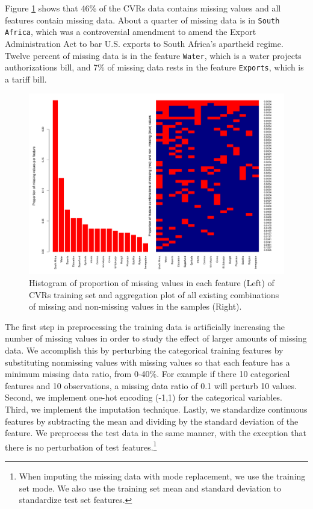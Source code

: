 \documentclass[10pt]{book}
\theoremstyle{definition}
\begin{document}
Figure \ref{fig:proportion-missing-votes} shows that 46\% of the CVRs data contains missing values and all features contain missing data. About a quarter of missing data is in \texttt{South Africa}, which was a controversial amendment to amend the Export Administration Act to bar U.S. exports to South Africa's apartheid regime. Twelve percent of missing data is in the feature \texttt{Water}, which is a water projects authorizations bill, and 7\% of missing data rests in the feature \texttt{Exports}, which is a tariff bill. 

\begin{figure}[h!]
\includegraphics [scale=0.45]{figure/proportion-missing-votes.pdf}\par
\caption{\footnotesize Histogram of proportion of missing values in each feature (Left) of CVRs training set and aggregation plot of all existing combinations of missing and non-missing values in the samples (Right).}
 \label{fig:proportion-missing-votes}
\end{figure}

\par
{}

The first step in preprocessing the training data is artificially increasing the number of missing values in order to study the effect of larger amounts of missing data. We accomplish this by perturbing the categorical training features by substituting nonmissing values with missing values so that each feature has a minimum missing data ratio, from 0-40\%. For example if there 10 categorical features and 10 observations, a missing data ratio of 0.1 will perturb 10 values. Second, we implement one-hot encoding (-1,1) for the categorical variables. Third, we implement the imputation technique. Lastly, we standardize continuous features by subtracting the mean and dividing by the standard deviation of the feature. We preprocess the test data in the same manner, with the exception that there is no perturbation of test features.\footnote{When imputing the missing data with mode replacement, we use the training set mode. We also use the training set mean and standard deviation to standardize test set features.}
\end{document}

